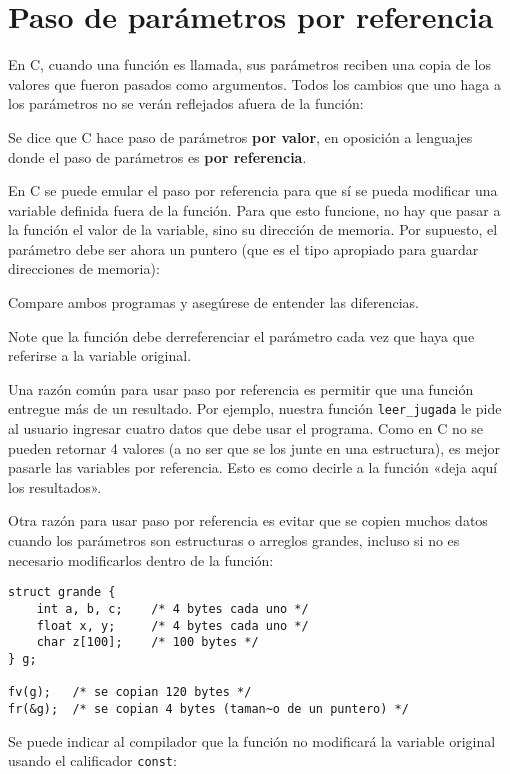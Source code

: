 \section{Paso de parámetros por referencia}

En C, cuando una función es llamada, sus parámetros reciben una copia de
los valores que fueron pasados como argumentos. Todos los cambios que
uno haga a los parámetros no se verán reflejados afuera de la función:

Se dice que C hace paso de parámetros \textbf{por valor}, en oposición a
lenguajes donde el paso de parámetros es \textbf{por referencia}.

En C se puede emular el paso por referencia para que sí se pueda
modificar una variable definida fuera de la función. Para que esto
funcione, no hay que pasar a la función el valor de la variable, sino su
dirección de memoria. Por supuesto, el parámetro debe ser ahora un
puntero (que es el tipo apropiado para guardar direcciones de memoria):

Compare ambos programas y asegúrese de entender las diferencias.

Note que la función debe derreferenciar el parámetro cada vez que haya
que referirse a la variable original.

Una razón común para usar paso por referencia es permitir que una
función entregue más de un resultado. Por ejemplo, nuestra función
\lstinline!leer_jugada! le pide al usuario ingresar cuatro datos que
debe usar el programa. Como en C no se pueden retornar 4 valores (a no
ser que se los junte en una estructura), es mejor pasarle las variables
por referencia. Esto es como decirle a la función «deja aquí los
resultados».

Otra razón para usar paso por referencia es evitar que se copien muchos
datos cuando los parámetros son estructuras o arreglos grandes, incluso
si no es necesario modificarlos dentro de la función:

\begin{lstlisting}
struct grande {
    int a, b, c;    /* 4 bytes cada uno */
    float x, y;     /* 4 bytes cada uno */
    char z[100];    /* 100 bytes */
} g;

fv(g);   /* se copian 120 bytes */
fr(&g);  /* se copian 4 bytes (taman~o de un puntero) */
\end{lstlisting}

Se puede indicar al compilador que la función no modificará la variable
original usando el calificador \lstinline!const!:

